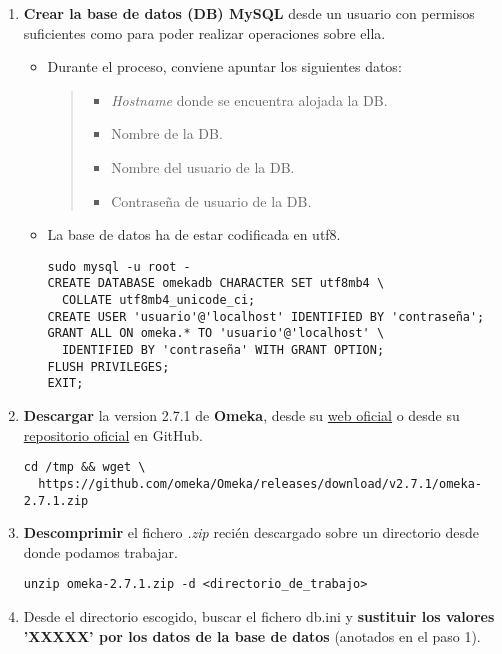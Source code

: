 \begin{enumerate}
\def\labelenumi{\arabic{enumi}.}
\tightlist
\item
  \textbf{Crear la base de datos (DB) MySQL} desde un usuario con
  permisos suficientes como para poder realizar operaciones sobre ella.
  \begin{itemize}
  \item
    Durante el proceso, conviene apuntar los siguientes datos:
    \begin{quote}
    \begin{itemize}
    \tightlist
    \item
      \emph{Hostname} donde se encuentra alojada la DB.
    \item
      Nombre de la DB.
    \item
      Nombre del usuario de la DB.
    \item
      Contraseña de usuario de la DB.
    \end{itemize}
    \end{quote}
  \item
    La base de datos ha de estar codificada en {utf8}.
\begin{verbatim}
sudo mysql -u root -
CREATE DATABASE omekadb CHARACTER SET utf8mb4 \
  COLLATE utf8mb4_unicode_ci;
CREATE USER 'usuario'@'localhost' IDENTIFIED BY 'contraseña';
GRANT ALL ON omeka.* TO 'usuario'@'localhost' \
  IDENTIFIED BY 'contraseña' WITH GRANT OPTION;
FLUSH PRIVILEGES;
EXIT;
\end{verbatim}
\end{itemize}
\item
  \textbf{Descargar} la version 2.7.1 de \textbf{Omeka}, desde su \href{https://omeka.org/classic/download/}{web oficial} o desde su \href{http://github.com/omeka/Omeka}{repositorio oficial} en
  GitHub.
\begin{verbatim}
cd /tmp && wget \
  https://github.com/omeka/Omeka/releases/download/v2.7.1/omeka-2.7.1.zip
\end{verbatim}
\item
  \textbf{Descomprimir} el fichero \emph{.zip} recién descargado sobre un
  directorio desde donde podamos trabajar.  
\begin{verbatim}
unzip omeka-2.7.1.zip -d <directorio_de_trabajo>
\end{verbatim}
\item
  Desde el directorio escogido, buscar el fichero {db.ini} y
  \textbf{sustituir los valores 'XXXXX' por los datos de la base de
  datos} (anotados en el paso 1).
\begin{verbatim}

\end{verbatim}
\end{enumerate}
